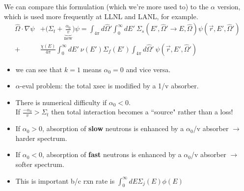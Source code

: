 \documentclass[12pt]{article}
\newcommand{\vOmega}{\ensuremath{\hat{\Omega}}}
\begin{document}
We can compare this formulation (which we're more used to) to the $\alpha$ version, which is used more frequently at LLNL and LANL, for example.
%
\begin{align*}
\vOmega \cdot \nabla \psi &+ \bigl(\Sigma_t + \underbrace{\frac{\alpha_0}{v}}_{\text{new}}\bigr)\psi = \int_{4 \pi} d\vOmega' \int_0^{\infty} dE' \: \Sigma_s(E', \vOmega' \rightarrow E, \vOmega) \psi(\vec{r}, E', \vOmega')\\
 +& \frac{\chi(E)}{4 \pi}\int_0^{\infty} dE' \: \nu(E') \Sigma_f(E') \int_{4 \pi} d\vOmega' \:\psi(\vec{r}, E', \vOmega')
\end{align*}
%
\begin{itemize}
\item we can see that $k=1$ means $\alpha_0 = 0$ and vice versa.
\item $\alpha$-eval problem: the total xsec is modified by a 1/v absorber.
\item There is numerical difficulty if $\alpha_0 < 0$.\\
If $\frac{-\alpha_0}{v} > \Sigma_t$ then total interaction becomes a ``source" rather than a loss!
\item If $\alpha_0 > 0$, absorption of \textbf{slow} neutrons is enhanced by a $\alpha_0$/v absorber $\rightarrow$ harder spectrum.
\item If $\alpha_0 < 0$, absorption of \textbf{fast} neutrons is enhanced by a $\alpha_0$/v absorber $\rightarrow$ softer spectrum.
\item This is important b/c rxn rate is $\int_0^{\infty} dE \Sigma_j(E) \phi(E)$
\end{itemize}
\end{document}
